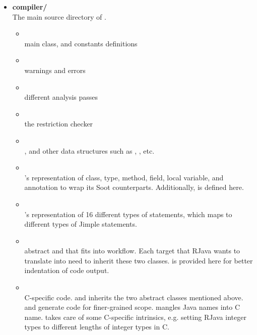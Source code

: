 \documentclass[12pt]{article}
\begin{document}
\begin{itemize}
\item
\textbf{compiler/\\}
The main source directory of \rjc. 
  \begin{itemize}
  
  \item {}\\
   main class, 
   and constants definitions
  
  \item {}\\
  \rjc warnings and errors
  
  \item {}\\
  different analysis passes
  
  \item {}\\
  the restriction checker
  
  \item {}\\
  ,  
  and other data structures
  such as , , etc.

  \item {}\\
  \rjc 's representation of class, type, method, field, local variable, 
  and annotation to wrap its Soot counterparts. Additionally, 
   is defined here. 
  
  \item {}\\
  \rjc's representation of 16 different types of statements, which
  maps to different types of Jimple statements.
  
  \item {}\\
  abstract  and 
   that fits 
  into \rjc workflow. Each target that RJava wants to translate into
  need to inherit these two classes. 
   is provided here for better indentation
  of code output. 
  
  \item {}\\
  C-specific code.  and
   inherits the two abstract classes
  mentioned above.  and 
  generate code for finer-grained scope.  mangles
  Java names into C name.  takes care of some
  C-specific intrinsics, e.g. setting RJava integer types
  to different lengths of integer types in C. 
  

\end{itemize}
\end{itemize}
\end{document}
